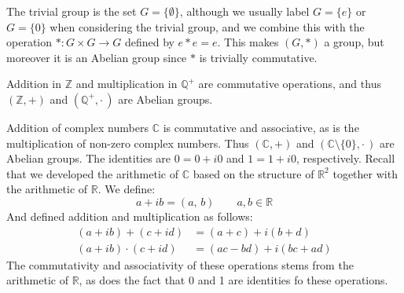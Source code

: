     \begin{example}
        The trivial group is the set $G=\{\emptyset\}$, although we usually
        label $G=\{e\}$ or $G=\{0\}$ when considering the trivial group, and we
        combine this with the operation $*:G\times{G}\rightarrow{G}$ defined by
        $e*e=e$. This makes $(G,*)$ a group, but moreover it is an Abelian group
        since $*$ is trivially commutative.
    \end{example}
    \begin{example}
        Addition in $\mathbb{Z}$ and multiplication in $\mathbb{Q}^{+}$ are
        commutative operations, and thus $(\mathbb{Z},+)$ and
        $(\mathbb{Q}^{+},\cdot\,)$ are Abelian groups.
    \end{example}
    \begin{example}
        Addition of complex numbers $\mathbb{C}$ is commutative and associative,
        as is the multiplication of non-zero complex numbers. Thus
        $(\mathbb{C},+)$ and $(\mathbb{C}\setminus\{0\},\cdot\,)$ are
        Abelian groups. The identities are $0=0+i0$ and $1=1+i0$, respectively.
        Recall that we developed the arithmetic of $\mathbb{C}$ based on the
        structure of $\mathbb{R}^{2}$ together with the arithmetic of
        $\mathbb{R}$. We define:
        \begin{equation}
            a+ib=(a,\,b)
            \quad\quad
            a,b\in\mathbb{R}
        \end{equation}
        And defined addition and multiplication as follows:
        \begin{subequations}
            \begin{align}
                (a+ib)+(c+id)&=(a+c)+i(b+d)\\
                (a+ib)\cdot(c+id)&=(ac-bd)+i(bc+ad)
            \end{align}
        \end{subequations}
        The commutativity and associativity of these operations stems from the
        arithmetic of $\mathbb{R}$, as does the fact that 0 and 1 are identities
        fo these operations.
    \end{example}
